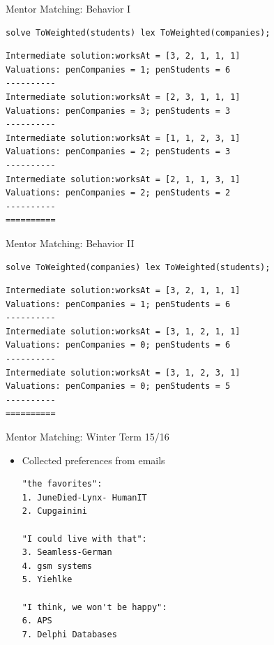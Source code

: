 \begin{frame}[fragile]{Mentor Matching: Behavior I}
\begin{lstlisting}
solve ToWeighted(students) lex ToWeighted(companies);
\end{lstlisting}
\begin{Verbatim}[fontsize=\small]
Intermediate solution:worksAt = [3, 2, 1, 1, 1]
Valuations: penCompanies = 1; penStudents = 6
----------
Intermediate solution:worksAt = [2, 3, 1, 1, 1]
Valuations: penCompanies = 3; penStudents = 3
----------
Intermediate solution:worksAt = [1, 1, 2, 3, 1]
Valuations: penCompanies = 2; penStudents = 3
----------
Intermediate solution:worksAt = [2, 1, 1, 3, 1]
Valuations: penCompanies = 2; penStudents = 2
----------
==========
\end{Verbatim}

\end{frame}

\begin{frame}[fragile]{Mentor Matching: Behavior II}
\begin{lstlisting}
solve ToWeighted(companies) lex ToWeighted(students);
\end{lstlisting}
\begin{Verbatim}[fontsize=\small]
Intermediate solution:worksAt = [3, 2, 1, 1, 1]
Valuations: penCompanies = 1; penStudents = 6
----------
Intermediate solution:worksAt = [3, 1, 2, 1, 1]
Valuations: penCompanies = 0; penStudents = 6
----------
Intermediate solution:worksAt = [3, 1, 2, 3, 1]
Valuations: penCompanies = 0; penStudents = 5
----------
==========
\end{Verbatim}

\end{frame}


\begin{frame}[fragile]{Mentor Matching: Winter Term 15/16}
\begin{itemize}
\item Collected preferences from emails 

\begin{parchment}
\begin{verbatim}
"the favorites":
1. JuneDied-Lynx- HumanIT
2. Cupgainini
 
"I could live with that":
3. Seamless-German
4. gsm systems
5. Yiehlke
 
"I think, we won't be happy":
6. APS
7. Delphi Databases
\end{verbatim} 
\end{parchment}
\end{itemize}
\end{frame}


